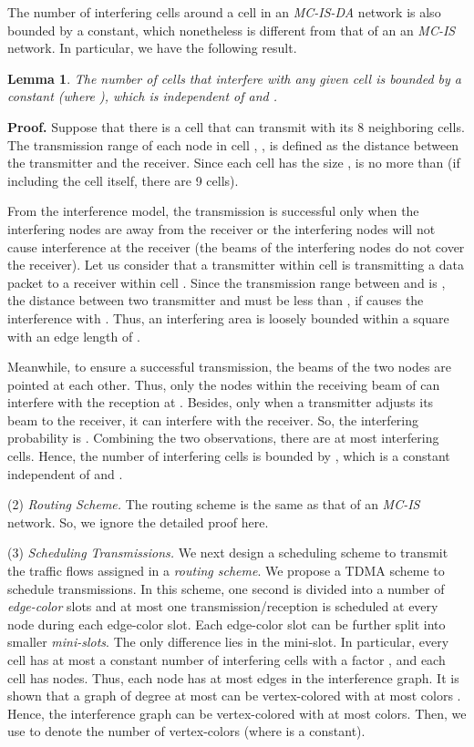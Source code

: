 \documentclass[10pt,journal]{IEEEtran}
\newtheorem{lemma}{Lemma}
\def\done{\hspace*{\fill} }
\begin{document}
The number of interfering cells around a cell in an \emph{MC-IS-DA} network is also bounded by a constant, which nonetheless is different from that of an an \emph{MC-IS} network. In particular, we have the following result.
\begin{lemma}
\label{lemma:interfering_cells-DA}
The number of cells that interfere with any given cell is bounded by a constant  (where ), which is independent of  and . 
\end{lemma}
\textbf{Proof.} 
Suppose that there is a cell  that can transmit with its 8 neighboring cells. The transmission range of each node in cell , , is defined as the distance between the transmitter and the receiver. Since each cell has the size ,  is no more than  (if including the cell itself, there are 9 cells). 

From the interference model, the transmission is successful only when the interfering nodes are  away from the receiver or the interfering nodes will not cause interference at the receiver (the beams of the interfering nodes do not cover the receiver). Let us consider that a transmitter  within cell  is transmitting a data packet to a receiver  within cell . Since the transmission range between  and  is , the distance between two transmitter  and  must be less than , if  causes the interference with . Thus, an interfering area is loosely bounded within a square with an edge length of . 

Meanwhile, to ensure a successful transmission, the beams of the two nodes are pointed at each other. Thus, only the nodes within the receiving beam of  can interfere with the reception at . Besides, only when a transmitter adjusts its beam to the receiver, it can interfere with the receiver. So, the interfering probability is . Combining the two observations, there are at most  interfering cells. Hence, the number of interfering cells is bounded by , which is a constant  independent of  and .
\done

(2) \emph{Routing Scheme.} The routing scheme is the same as that of an \emph{MC-IS} network. So, we ignore the detailed proof here.

(3) \emph{Scheduling Transmissions.}
We next design a scheduling scheme to transmit the traffic flows assigned in a \textit{routing scheme}. We propose a TDMA scheme to schedule transmissions. In this scheme, one second is divided into a number of \textit{edge-color} slots and at most one transmission/reception is scheduled at every node during each edge-color slot. Each edge-color slot can be further split into smaller \textit{mini-slots}. The only difference lies in the mini-slot. In particular, every cell has at most a constant number of interfering cells with a factor , and each cell has  nodes. Thus, each node has at most  edges in the interference graph. It is shown that a graph of degree at most  can be vertex-colored with at most  colors \cite{Douglas:2001}. Hence, the interference graph can be vertex-colored with at most  colors. Then, we use  to denote the number of vertex-colors (where  is a constant).
\end{document}
